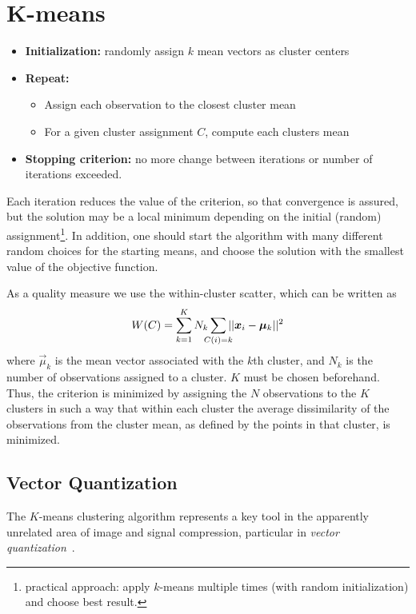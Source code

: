 
\section{K-means}

\begin{itemize}
	\item \textbf{Initialization:} randomly assign $k$ mean vectors as cluster centers
	\item \textbf{Repeat:}
		\begin{itemize}
			\item Assign each observation to the closest cluster mean
			\item For a given cluster assignment \(C\), compute each clusters mean
		\end{itemize}
	\item \textbf{Stopping criterion:} no more change between iterations or number of iterations exceeded.
\end{itemize}

Each iteration reduces the value of the criterion, so that convergence is assured, but the solution may be a local minimum depending on the initial (random) assignment\footnote{practical approach: apply $k$-means multiple times (with random initialization) and choose best result.}. 
In addition, one should start the algorithm with many different random choices for the starting means, and choose the solution with the smallest value of the objective function.

As a quality measure we use the within-cluster scatter, which can be written as
\begin{equation*}
	W(C) = \sum_{k=1}^K N_k \sum_{\mathclap{C(i) = k}} ||\vec{x}_i - \vec{\mu}_k||^2
\end{equation*}
where \(\vec{\mu}_k\) is the mean vector associated with the \(k\)th cluster, and \(N_k\) is the number of observations assigned to a cluster. $K$ must be chosen beforehand. 
Thus, the criterion is minimized by assigning the \(N\) observations to the \(K\) clusters in such a way that within each cluster the average dissimilarity of the observations from the cluster mean, as defined by the points in that cluster, is minimized.

\subsection{Vector Quantization}
The \(K\)-means clustering algorithm represents a key tool in the apparently unrelated area of image and signal compression, particular in \textit{vector quantization}~\cite{gersho}.


